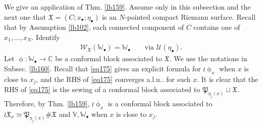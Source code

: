 \documentclass[12pt,a4paper,notitlepage]{article}
\theoremstyle{definition}
\theoremstyle{plain}
\newcommand{\fk}{\mathfrak}
\newcommand{\mc}{\mathcal}
\newcommand{\scr}{\mathscr}
\newcommand{\blt}{\bullet}
\newcommand{\Vbb}{\mathbb V}
\newcommand{\Wbb}{\mathbb W}
\newcommand{\Cbb}{\mathbb C}
\numberwithin{equation}{section}
\begin{document}
\subsection{}

We give an application of Thm. \ref{lb159}. Assume only in this subsection and the next one that $\fk X=(C;x_\blt;\eta_\blt)$ is an $N$-pointed compact Riemann surface. Recall that by Assumption \ref{lb102}, each connected component of $C$ contains one of $x_1,\dots,x_N$. Identify
\begin{align}
\scr W_{\fk X}(\Wbb_\blt)=\Wbb_\blt\qquad\text{via }\mc U(\eta_\blt).\label{eq250}
\end{align}
Let $\upphi:\Wbb_\blt\rightarrow\Cbb$ be a conformal block associated to $\fk X$.  We use the notations in Subsec. \ref{lb160}. Recall that \eqref{eq175}  gives an explicit formula for $\wr\upphi_x$ when $x$ is close to $x_j$, and the RHS of \eqref{eq175} converges a.l.u.. for such $x$. It is clear that the RHS of \eqref{eq175} is the sewing of a conformal block associated to $\fk P_{\eta_j(x)}\sqcup \fk X$. Therefore, by Thm. \ref{lb159}, $\wr\upphi_x$ is a conformal block associated to $\wr\fk X_x\simeq \fk P_{\eta_j(x)}\#\fk X$ and $\Vbb,\Wbb_\blt$ when $x$ is close to $x_j$.
\end{document}
